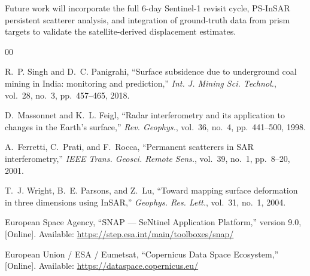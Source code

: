 \documentclass[conference]{IEEEtran}
\begin{document}
Future work will incorporate the full 6-day Sentinel-1 revisit cycle,
PS-InSAR persistent scatterer analysis, and integration of ground-truth
data from prism targets to validate the satellite-derived displacement
estimates.

\begin{thebibliography}{00}

R.~P. Singh and D.~C. Panigrahi,
``Surface subsidence due to underground coal mining in India: monitoring
and prediction,''
\textit{Int. J. Mining Sci. Technol.}, vol.~28, no.~3, pp.~457--465, 2018.

D.~Massonnet and K.~L. Feigl,
``Radar interferometry and its application to changes in the Earth's surface,''
\textit{Rev. Geophys.}, vol.~36, no.~4, pp.~441--500, 1998.

A.~Ferretti, C.~Prati, and F.~Rocca,
``Permanent scatterers in SAR interferometry,''
\textit{IEEE Trans. Geosci. Remote Sens.}, vol.~39, no.~1, pp.~8--20, 2001.

T.~J. Wright, B.~E. Parsons, and Z.~Lu,
``Toward mapping surface deformation in three dimensions using InSAR,''
\textit{Geophys. Res. Lett.}, vol.~31, no.~1, 2004.

European Space Agency,
``SNAP --- SeNtinel Application Platform,'' version 9.0,
[Online]. Available: \url{https://step.esa.int/main/toolboxes/snap/}

European Union / ESA / Eumetsat,
``Copernicus Data Space Ecosystem,''
[Online]. Available: \url{https://dataspace.copernicus.eu/}

\end{thebibliography}
\end{document}
